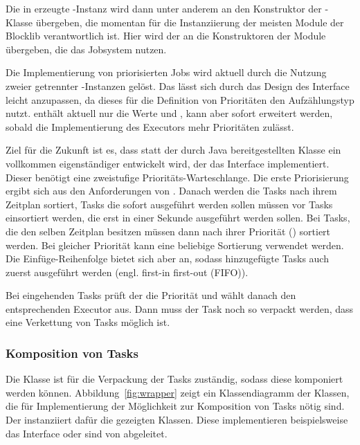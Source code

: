 Die in  erzeugte -Instanz wird dann unter anderem an den Konstruktor der -Klasse übergeben, die momentan für die Instanziierung der meisten Module der Blocklib verantwortlich ist. Hier wird der  an die Konstruktoren der Module übergeben, die das Jobsystem nutzen.

Die Implementierung von priorisierten Jobs wird aktuell durch die Nutzung zweier getrennter -Instanzen gelöst. Das lässt sich durch das Design des Interface  leicht anzupassen, da dieses für die Definition von Prioritäten den Aufzählungstyp  nutzt.  enthält aktuell nur die Werte  und , kann aber sofort erweitert werden, sobald die Implementierung des Executors mehr Prioritäten zulässt. 

Ziel für die Zukunft ist es, dass statt der durch Java bereitgestellten  Klasse ein vollkommen eigenständiger  entwickelt wird, der das Interface  implementiert. Dieser benötigt eine zweistufige Prioritäts-Warteschlange. Die erste Priorisierung ergibt sich aus den Anforderungen von . Danach werden die Tasks nach ihrem Zeitplan sortiert, Tasks die sofort ausgeführt werden sollen müssen vor Tasks einsortiert werden, die erst in einer Sekunde ausgeführt werden sollen. Bei Tasks, die den selben Zeitplan besitzen müssen dann nach ihrer Priorität () sortiert werden. Bei gleicher Priorität kann eine beliebige Sortierung verwendet werden. Die Einfüge-Reihenfolge bietet sich aber an, sodass hinzugefügte Tasks auch zuerst ausgeführt werden (engl. first-in first-out (FIFO)).

Bei eingehenden Tasks prüft der  die Priorität und wählt danach den entsprechenden Executor aus. Dann muss der Task noch so verpackt werden, dass eine Verkettung von Tasks möglich ist.

\subsubsection{Komposition von Tasks}\label{sec:Verkettung}
Die Klasse  ist für die Verpackung der Tasks zuständig, sodass diese komponiert werden können. Abbildung~\vref{fig:wrapper} zeigt ein Klassendiagramm der Klassen, die für Implementierung der Möglichkeit zur Komposition von Tasks nötig sind. Der  instanziiert dafür die gezeigten Klassen. Diese implementieren beispielsweise das Interface  oder sind von  abgeleitet.

